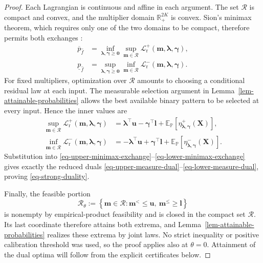 \begin{proof}
  Each Lagrangian is continuous and affine in each argument. The set $\mathcal R$ is compact and convex, and the multiplier domain $\mathbb R_+^{2K}$ is convex. Sion's minimax theorem, which requires only one of the two domains to be compact, therefore permits both exchanges \citep{S58}:
  \begin{align}
    \overline p_{\hat f}
    &=\inf_{\bm\lambda,\bm\gamma\ge\bm0}\sup_{\bm m\in\mathcal R}
      \mathcal L_{\mathrm r}^+(\bm m,\bm\lambda,\bm\gamma),
      \label{eq-upper-minimax-exchange}\\
    \underline p_{\hat f}
    &=\sup_{\bm\lambda,\bm\gamma\ge\bm0}\inf_{\bm m\in\mathcal R}
      \mathcal L_{\mathrm r}^-(\bm m,\bm\lambda,\bm\gamma).
      \label{eq-lower-minimax-exchange}
  \end{align}
  For fixed multipliers, optimization over $\mathcal R$ amounts to choosing a conditional residual law at each input. The measurable selection argument in Lemma~\ref{lem-attainable-probabilities} allows the best available binary pattern to be selected at every input. Hence the inner values are
  \begin{align}
    \sup_{\bm m\in\mathcal R}\mathcal L_{\mathrm r}^+(\bm m,\bm\lambda,\bm\gamma)
    &=\bm\lambda^\top\bm u-\bm\gamma^\top\bm l
      +\mathbb E_{\mathbb P}\left[\eta^+_{\bm\lambda,\bm\gamma}(\bm X)\right],
      \label{eq-upper-inner-value}\\
    \inf_{\bm m\in\mathcal R}\mathcal L_{\mathrm r}^-(\bm m,\bm\lambda,\bm\gamma)
    &=-\bm\lambda^\top\bm u+\bm\gamma^\top\bm l
      +\mathbb E_{\mathbb P}\left[\eta^-_{\bm\lambda,\bm\gamma}(\bm X)\right].
      \label{eq-lower-inner-value}
  \end{align}
  Substitution into \eqref{eq-upper-minimax-exchange}--\eqref{eq-lower-minimax-exchange} gives exactly the reduced duals \eqref{eq-upper-measure-dual}--\eqref{eq-lower-measure-dual}, proving \eqref{eq-strong-duality}.

  Finally, the feasible portion
  \[
    \mathcal R_\theta:=\left\{\bm m\in\mathcal R:
      \bm m^{<}\le\bm u,\ \bm m^{\le}\ge\bm l\right\}
  \]
  is nonempty by empirical-product feasibility and is closed in the compact set $\mathcal R$. Its last coordinate therefore attains both extrema, and Lemma~\ref{lem-attainable-probabilities} realizes these extrema by joint laws. No strict inequality or positive calibration threshold was used, so the proof applies also at $\theta=0$. Attainment of the dual optima will follow from the explicit certificates below.
\end{proof}

